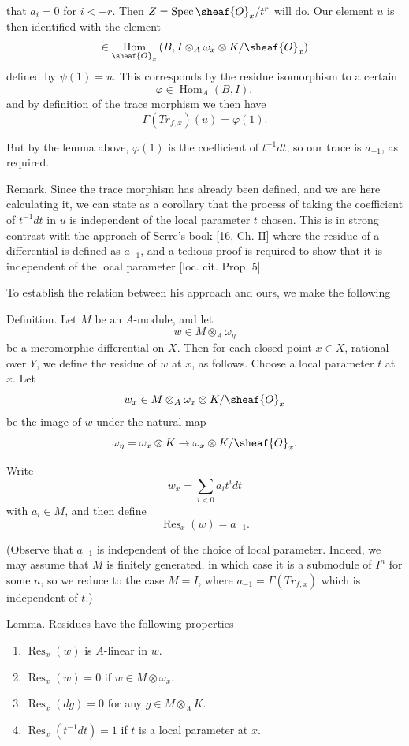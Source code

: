 \documentclass[12pt]{book}
\DeclareMathOperator{\Spec}{Spec}
\DeclareMathOperator{\Hom}{Hom}
\DeclareMathOperator{\Res}{Res}
\begin{document}
\setcounter{page}{363}
that \(a_{i}=0\) for \(i<-r\). Then \(Z = \Spec \sheaf{O}_{x}/t^{r}\) will do.
Our element \(u\) is then identified with the element
\[\in \Hom_{\sheaf{O}_{x}}\left(B, I \otimes_{A} \omega_{x} \otimes K / \sheaf{O}_{x}\right)\]
defined by \(\psi(1)=u\). This corresponds by the residue isomorphism to a certain
\[\varphi \in \Hom_{A}(B,I),\]
and by definition of the trace morphism we then have
\[\Gamma\left(Tr_{f,x}\right)(u)=\varphi(1) .\]

But by the lemma above, \(\varphi(1)\) is the coefficient of \(t^{-1} dt\), so our trace is \(a_{-1}\), as required.

\setcounter{page}{364}
Remark. Since the trace morphism has already been defined, and we are here calculating it, we can state as a corollary that the process of taking the coefficient of \(t^{-1} dt\) in \(u\) is independent of the local parameter \(t\) chosen.
This is in strong contrast with the approach of Serre's book [16, Ch. II] where the residue of a differential is defined as \(a_{-1}\), and a tedious proof is required to show that it is independent of the local parameter [loc. cit. Prop. 5].

To establish the relation between his approach and ours, we make the following

Definition. Let \(M\) be an \(A\)-module, and let
\[w \in M \otimes_{A} \omega_{\eta}\]
be a meromorphic differential on \(X\).
Then for each closed point \(x \in X\), rational over \(Y\), we define the residue of \(w\) at \(x\), as follows.
Choose a local parameter \(t\) at \(x\). Let
\[w_{x} \in M \otimes_{A} \omega_{x} \otimes K / \sheaf{O}_{x}\]
be the image of \(w\) under the natural map
\[\omega_{\eta}=\omega_{x} \otimes K \to \omega_{x} \otimes K / \sheaf{O}_{x} .\]

Write
\[w_{x}=\sum_{i<0} a_{i} t^{i} dt\]
with \(a_{i} \in M\), and then define
\[\Res_{x}(w)=a_{-1} .\]

\setcounter{page}{365}
(Observe that \(a_{-1}\) is independent of the choice of local parameter. Indeed, we may assume that \(M\) is finitely generated, in which case it is a submodule of \(I^{n}\) for some \(n\), so we reduce to the case \(M=I\), where \(a_{-1}=\Gamma(Tr_{f,x})\) which is independent of \(t\).)

Lemma. Residues have the following properties
\begin{enumerate}
\item \(\Res_{x}(w)\) is \(A\)-linear in \(w\).
\item \(\Res_{x}(w)=0\) if \(w \in M \otimes \omega_{x}\).
\item \(\Res_{x}(dg)=0\) for any \(g \in M \otimes_{A} K\).
\item \(\Res_{x}(t^{-1} dt)=1\) if \(t\) is a local parameter at \(x\).
\end{enumerate}
\end{document}
